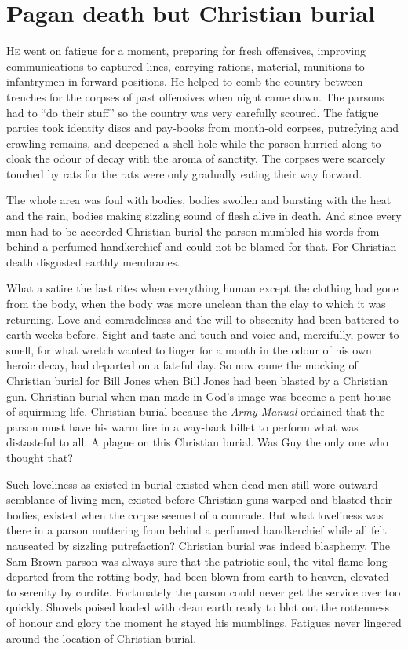 \chapter*{\textsf{Pagan death but Christian burial}}

H\textsc{e} went on fatigue for a moment, preparing for fresh offensives, improving communications to captured lines, carrying rations, material, munitions to infantrymen in forward positions. He helped to comb the country between trenches for the corpses of past offensives when night came down. The parsons had to ``do their stuff'' so the country was very carefully scoured. The fatigue parties took identity discs and pay-books from month-old corpses, putrefying and crawling remains, and deepened a shell-hole while the parson hurried along to cloak the odour of decay with the aroma of sanctity. The corpses were scarcely touched by rats for the rats were only gradually eating their way forward.

The whole area was foul with bodies, bodies swollen and bursting with the heat and the rain, bodies making sizzling sound of flesh alive in death. And since every man had to be accorded Christian burial the parson mumbled his words from behind a perfumed handkerchief and could not be blamed for that. For Christian death disgusted earthly membranes.

What a satire the last rites when everything human except the clothing had gone from the body, when the body was more unclean than the clay to which it was returning. Love and comradeliness and the will to obscenity had been battered to earth weeks before. Sight and taste and touch and voice and, mercifully, power to smell, for what wretch wanted to linger for a month in the odour of his own heroic decay, had departed on a fateful day. So now came the mocking of Christian burial for Bill Jones when Bill Jones had been blasted by a Christian gun. Christian burial when man made in God's image was become a pent-house of squirming life. Christian burial because the \textit{Army Manual} ordained that the parson must have his warm fire in a way-back billet to perform what was distasteful to all. A plague on this Christian burial. Was Guy the only one who thought that?

Such loveliness as existed in burial existed when dead men still wore outward semblance of living men, existed before Christian guns warped and blasted their bodies, existed when the corpse seemed of a comrade. But what loveliness was there in a parson muttering from behind a perfumed handkerchief while all felt nauseated by sizzling putrefaction? Christian burial was indeed blasphemy. The Sam Brown parson was always sure that the patriotic soul, the vital flame long departed from the rotting body, had been blown from earth to heaven, elevated to serenity by cordite. Fortunately the parson could never get the service over too quickly. Shovels poised loaded with clean earth ready to blot out the rottenness of honour and glory the moment he stayed his mumblings. Fatigues never lingered around the location of Christian burial.

